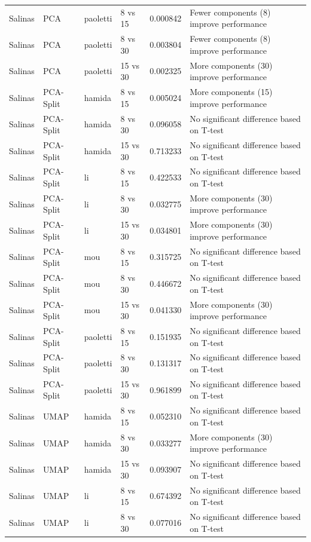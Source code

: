 \begin{longtable}{llllrl}
Salinas & PCA & paoletti & 8 vs 15 & 0.000842 & Fewer components (8) improve performance \\
Salinas & PCA & paoletti & 8 vs 30 & 0.003804 & Fewer components (8) improve performance \\
Salinas & PCA & paoletti & 15 vs 30 & 0.002325 & More components (30) improve performance \\
Salinas & PCA-Split & hamida & 8 vs 15 & 0.005024 & More components (15) improve performance \\
Salinas & PCA-Split & hamida & 8 vs 30 & 0.096058 & No significant difference based on T-test \\
Salinas & PCA-Split & hamida & 15 vs 30 & 0.713233 & No significant difference based on T-test \\
Salinas & PCA-Split & li & 8 vs 15 & 0.422533 & No significant difference based on T-test \\
Salinas & PCA-Split & li & 8 vs 30 & 0.032775 & More components (30) improve performance \\
Salinas & PCA-Split & li & 15 vs 30 & 0.034801 & More components (30) improve performance \\
Salinas & PCA-Split & mou & 8 vs 15 & 0.315725 & No significant difference based on T-test \\
Salinas & PCA-Split & mou & 8 vs 30 & 0.446672 & No significant difference based on T-test \\
Salinas & PCA-Split & mou & 15 vs 30 & 0.041330 & More components (30) improve performance \\
Salinas & PCA-Split & paoletti & 8 vs 15 & 0.151935 & No significant difference based on T-test \\
Salinas & PCA-Split & paoletti & 8 vs 30 & 0.131317 & No significant difference based on T-test \\
Salinas & PCA-Split & paoletti & 15 vs 30 & 0.961899 & No significant difference based on T-test \\
Salinas & UMAP & hamida & 8 vs 15 & 0.052310 & No significant difference based on T-test \\
Salinas & UMAP & hamida & 8 vs 30 & 0.033277 & More components (30) improve performance \\
Salinas & UMAP & hamida & 15 vs 30 & 0.093907 & No significant difference based on T-test \\
Salinas & UMAP & li & 8 vs 15 & 0.674392 & No significant difference based on T-test \\
Salinas & UMAP & li & 8 vs 30 & 0.077016 & No significant difference based on T-test \\

\end{longtable}
